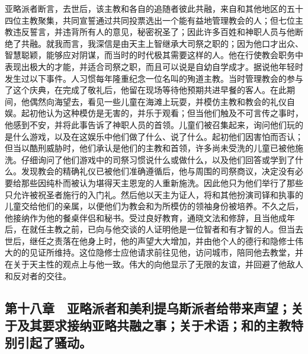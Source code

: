 亚略派者断言，去世后，该主教和各自的追随者彼此共融，来自和其他地区的五十四位主教聚集，共同宣誓通过共同投票选出一个能有益地管理教会的人；但七位主教违反誓言，并违背所有人的意见，秘密祝圣了；因此许多百姓和神职人员与他断绝了共融。就我而言，我深信是由天主上智继承大司祭之职的；因为他口才出众、智慧聪颖，能够应对阴谋，而当时的时代极其需要这样的人。他在行使教会职务中表现出极大的才能，并适合司祭之职，而且可以说是自幼自学成才。据说他年轻时发生过以下事件。人习惯每年隆重纪念一位名叫的殉道主教。当时管理教会的参与了这个庆典，在完成了敬礼后，他留在现场等待他预期共进早餐的客人。在此期间，他偶然向海望去，看见一些儿童在海滩上玩耍，并模仿主教和教会的礼仪自娱。起初他认为这种模仿是无害的，并乐于观看；但当他们触及不可言传之事时，他感到不安，并将此事告诉了神职人员的首领。儿童们被召集起来，询问他们玩的是什么游戏，以及在这娱乐中他们做了什么、说了什么。起初他们因害怕而否认；但当以酷刑威胁时，他们承认是他们的主教和首领，许多尚未受洗的儿童已被他施洗。仔细询问了他们游戏中的司祭习惯说什么或做什么，以及他们回答或学到了什么。发现教会的精确礼仪已被他们准确遵循后，他与周围的司祭商议，决定没有必要给那些因纯朴而被认为堪得天主恩宠的人重新施洗。因此他只为他们举行了那些只允许被祝圣者施行的入门礼。然后他以天主为证人，将和其他扮演司铎和执事的儿童交给他们的亲属，以便他们为教会和为所模仿的领袖身份被培养。不久之后，他接纳作为他的餐桌伴侣和秘书。受过良好教育，通晓文法和修辞，且当他成年后，在就任主教之前，已向与他交谈的人证明他是一位智者和有才智的人。但当去世后，继任之责落在他身上时，他的声望大大增加，并由他个人的德行和隐修士伟大的的见证所维持。这位隐修士应他请求前往见他，访问城市，陪同他去教堂，并在关于天主性的观点上与他一致。伟大的向他显示了无限的友谊，并回避了他敌人和反对者的交往。\par


\subsection{第十八章　亚略派者和美利提乌斯派者给带来声望；关于及其要求接纳亚略共融之事；关于术语；和的主教特别引起了骚动。}

